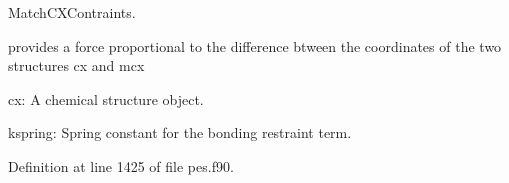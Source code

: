Match\+C\+X\+Contraints. 

provides a force proportional to the difference btween the coordinates of the two structures cx and mcx


\begin{DoxyItemize}
\item cx\+: A chemical structure object.
\item kspring\+: Spring constant for the bonding restraint term. 
\end{DoxyItemize}

Definition at line 1425 of file pes.\+f90.

